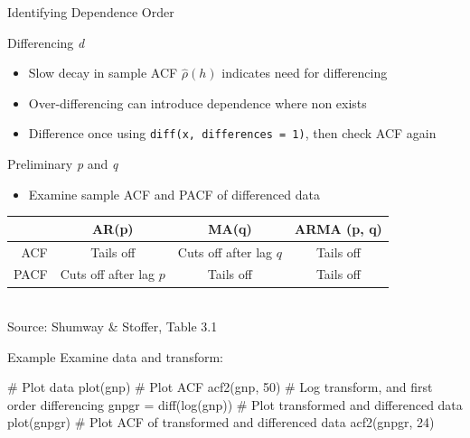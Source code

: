 \documentclass[ignorenonframetext,xcolor=x11names]{beamer}
\begin{document}
\begin{frame}[label=full]{Identifying Dependence Order}
\small
\begin{block}{Differencing \emph{d}}
\begin{itemize}
   \item Slow decay in sample ACF $\hat\rho(h)$ indicates need for differencing
   \item Over-differencing can introduce dependence where non exists
   \item Difference once using \texttt{diff(x, differences = 1)}, then check ACF again
\end{itemize}
\end{block}

\begin{block}{Preliminary \emph{p} and \emph{q}}
\begin{itemize}
   \item Examine sample ACF and PACF of differenced data %
\end{itemize}
\vspace{.5\baselineskip} 
\renewcommand{\arraystretch}{1.5}
\begin{tabular}{r|c|c|c} \hline
 & AR(p) & MA(q) & ARMA (p, q) \\ \hline
 ACF & Tails off & Cuts off after lag $q$ & Tails off \\
 PACF & Cuts off after lag $p$ & Tails off & Tails off \\ \hline
\end{tabular} \\
\vspace{.5\baselineskip}
\scriptsize Source: Shumway \& Stoffer, Table 3.1 \normalsize
\end{block}
\end{frame}

\begin{frame}[label=withcode,fragile]{Example}
Examine data and transform:
\begin{Rcode}
# Plot data
plot(gnp)
# Plot ACF
acf2(gnp, 50)
# Log transform, and first order differencing
gnpgr = diff(log(gnp))
# Plot transformed and differenced data
plot(gnpgr)
# Plot ACF of transformed and differenced data
acf2(gnpgr, 24)
\end{Rcode}
\end{frame}
\end{document}
